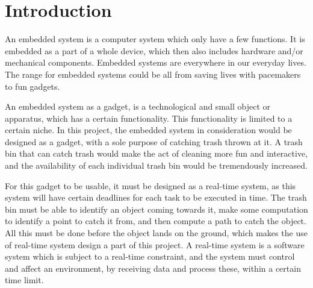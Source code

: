 \chapter{Introduction}
\label{chap:Introduction}

An embedded system is a computer system which only have a few functions. It is embedded as a part of a whole device, which then also includes hardware and/or mechanical components. Embedded systems are everywhere in our everyday lives. The range for embedded systems could be all from saving lives with pacemakers to fun gadgets.\citep{es}

An embedded system as a gadget, is a technological and small object or apparatus, which has a certain functionality. This functionality is limited to a certain niche. \newline
In this project, the embedded system in consideration would be designed as a gadget, with a sole purpose of catching trash thrown at it. A trash bin that can catch trash would make the act of cleaning more fun and interactive, and the availability of each individual trash bin would be tremendously increased.

For this gadget to be usable, it must be designed as a real-time system, as this system will have certain deadlines for each task to be executed in time. The trash bin must be able to identify an object coming towards it, make some computation to identify a point to catch it from, and then compute a path to catch the object. All this must be done before the object lands on the ground, which makes the use of real-time system design a part of this project. A real-time system is a software system which is subject to a real-time constraint, and the system must control and affect an environment, by receiving data and process these, within a certain time limit.